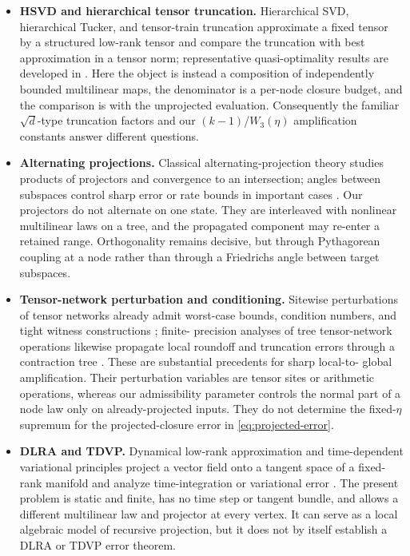\documentclass[11pt]{article}
\theoremstyle{definition}
\begin{document}
\begin{itemize}
\item \textbf{HSVD and hierarchical tensor truncation.}  Hierarchical SVD,
hierarchical Tucker, and tensor-train truncation approximate a fixed tensor by
a structured low-rank tensor and compare the truncation with best approximation
in a tensor norm; representative quasi-optimality results are developed in
\cite{Grasedyck2010,Oseledets2011,HackbuschKuhn2009}.  Here the object is instead
a composition of independently bounded multilinear maps, the denominator is a
per-node closure budget, and the comparison is with the unprojected evaluation.
Consequently the familiar $\sqrt{d}$-type truncation factors and our
$(k-1)$/$W_3(\eta)$ amplification constants answer different questions.

\item \textbf{Alternating projections.}  Classical alternating-projection
theory studies products of projectors and convergence to an intersection;
angles between subspaces control sharp error or rate bounds in important cases
\cite{KayalarWeinert1988,DeutschHundal1997}.  Our projectors do not alternate on
one state.  They are interleaved with nonlinear multilinear laws on a tree, and
the propagated component may re-enter a retained range.  Orthogonality remains
decisive, but through Pythagorean coupling at a node rather than through a
Friedrichs angle between target subspaces.

\item \textbf{Tensor-network perturbation and conditioning.}  Sitewise
perturbations of tensor networks already admit worst-case bounds, condition
numbers, and tight witness constructions \cite{ZhangSolomonik2020}; finite-
precision analyses of tree tensor-network operations likewise propagate local
roundoff and truncation errors through a contraction tree
\cite{BaboulinEtAl2025}.  These are substantial precedents for sharp local-to-
global amplification.  Their perturbation variables are tensor sites or
arithmetic operations, whereas our admissibility parameter controls the normal
part of a node law only on already-projected inputs.  They do not determine the
fixed-$\eta$ supremum for the projected-closure error in
\eqref{eq:projected-error}.

\item \textbf{DLRA and TDVP.}  Dynamical low-rank approximation and
time-dependent variational principles project a vector field onto a tangent
space of a fixed-rank manifold and analyze time-integration or variational error
\cite{KochLubich2007,LubichOseledetsVandereycken2015,HaegemanEtAl2016}.  The
present problem is static and finite, has no time step or tangent bundle, and
allows a different multilinear law and projector at every vertex.  It can
serve as a local algebraic model of recursive projection, but it does not by
itself establish a DLRA or TDVP error theorem.
\end{itemize}
\end{document}
